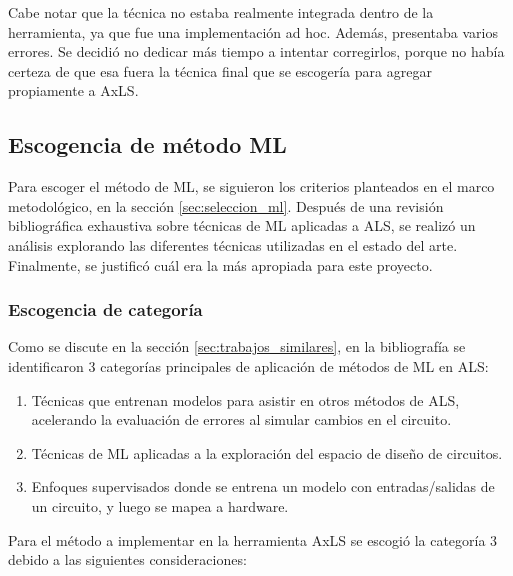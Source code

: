 Cabe notar que la técnica no estaba realmente integrada dentro de la
herramienta, ya que fue una implementación ad hoc. Además, presentaba varios
errores. Se decidió no dedicar más tiempo a intentar corregirlos, porque no
había certeza de que esa fuera la técnica final que se escogería para agregar
propiamente a AxLS.

\subsection{Escogencia de método ML}

Para escoger el método de ML, se siguieron los criterios planteados en el marco
metodológico, en la sección \ref{sec:seleccion_ml}. Después de una revisión
bibliográfica exhaustiva sobre técnicas de ML aplicadas a ALS, se realizó un
análisis explorando las diferentes técnicas utilizadas en el estado del arte.
Finalmente, se justificó cuál era la más apropiada para este proyecto.

\subsubsection{Escogencia de categoría}

Como se discute en la sección \ref{sec:trabajos_similares}, en la bibliografía
se identificaron 3 categorías principales de aplicación de métodos de ML en
ALS:

\begin{enumerate}
    \item Técnicas que entrenan modelos para asistir en otros métodos de ALS,
      acelerando la evaluación de errores al simular cambios en el circuito.
    \item Técnicas de ML aplicadas a la exploración del espacio de diseño de
      circuitos.
    \item Enfoques supervisados donde se entrena un modelo con entradas/salidas
      de un circuito, y luego se mapea a hardware.
\end{enumerate}

Para el método a implementar en la herramienta AxLS se escogió la categoría 3
debido a las siguientes consideraciones:

